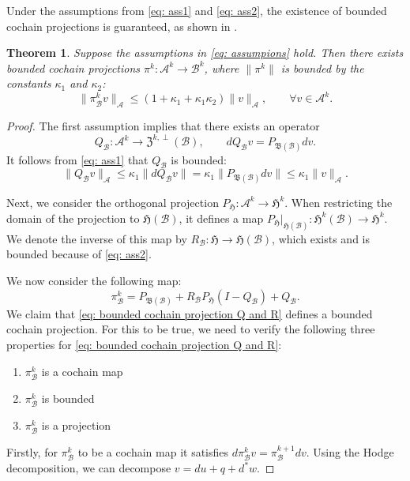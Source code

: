 \documentclass[reqno]{amsart}
\numberwithin{equation}{section}
\newtheorem{theorem}{Theorem}[section]
\theoremstyle{definition}
\newcommand{\Ac}{\mathcal{A}}
\newcommand{\Bc}{\mathcal{B}}
\newcommand{\Hf}{\mathfrak{H}}
\begin{document}
Under the assumptions from \cref{eq: ass1} and \cref{eq: ass2}, the existence of bounded cochain projections is guaranteed, as shown in \cite{arnoldFEEC2}.

\begin{theorem}\label{theorem: existence of bcp}
Suppose the assumptions in \cref{eq: assumpions} hold. Then there exists bounded cochain projections $\pi^k: \Ac^k \to \Bc^k$, where $\|\pi^k\|$ is bounded by the constants $\kappa_1$ and $\kappa_2$:
\begin{equation}
\|\pi^k_\Bc v \|_\Ac \leq (1 + \kappa_1 + \kappa_1 \kappa_2) \|v\|_\Ac, \qquad \forall v \in \Ac^k.
\end{equation}
\end{theorem}

\begin{proof}
The first assumption implies that there exists an operator
\begin{equation}
Q_\Bc: \Ac^k \to \mathfrak{Z}^{k, \perp}(\Bc), \qquad dQ_\Bc v = P_{\mathfrak{B}(\Bc)} dv.
\end{equation}
It follows from \cref{eq: ass1} that $Q_\Bc$ is bounded:
\begin{equation}
\|Q_\Bc v\|_\Ac \leq \kappa_1 \|d Q_\Bc v\|  = \kappa_1\| P_{\mathfrak{B}(\Bc)} dv \| \leq \kappa_1
\|v\|_\Ac.
\end{equation}

Next, we consider the orthogonal projection $P_\Hf: \Ac^k \to \Hf^k$. When restricting the domain of the projection to $\Hf(\Bc)$, it defines a map $P_\Hf|_{\Hf(\Bc)}: \Hf^k(\Bc) \to \Hf^k$. We denote the inverse of this map by $R_\Bc: \Hf \to \Hf(\Bc)$, which exists and is bounded because of \cref{eq: ass2}.

We now consider the following map:
\begin{equation}\label{eq: bounded cochain projection Q and R}
\pi_\Bc^k = P_{\mathfrak{B}(\Bc)} + R_\Bc P_{\mathfrak{H}}(I - Q_\Bc) + Q_\Bc. 
\end{equation}
We claim that \cref{eq: bounded cochain projection Q and R} defines a bounded cochain projection. For this to be true, we need to verify the following three properties for \cref{eq: bounded cochain projection Q and R}: 
\begin{enumerate}
    \item $\pi_\Bc^k$ is a cochain map
    \item $\pi_\Bc^k$ is bounded
    \item $\pi_\Bc^k$ is a projection
\end{enumerate}
Firstly, for $\pi^k_\Bc$ to be a cochain map it satisfies $d\pi^k_\Bc v = \pi^{k+1}_\Bc dv$. Using the Hodge decomposition, we can decompose $v = du + q + d^*w$.


\end{proof}
\end{document}
